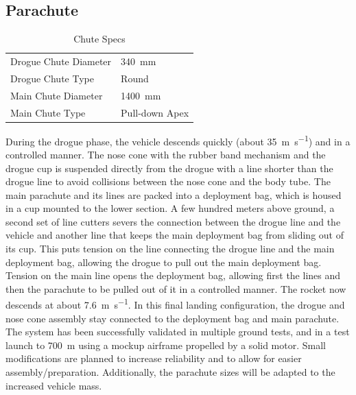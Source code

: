 \subsection{Parachute}

\begin{table}[h]
\centering
\begin{tabular}{ll}
Drogue Chute Diameter & \SI{340}{\milli\meter} \\
Drogue Chute Type & Round \\
Main Chute Diameter & \SI{1400}{\milli\meter} \\
Main Chute Type & Pull-down Apex
\end{tabular}
\caption{Chute Specs}
\label{tab:chute_specs}
\end{table}

During the drogue phase, the vehicle descends quickly (about \SI{35}{\meter\per\second}) and in a controlled manner. The nose cone with the rubber band mechanism and the drogue cup is suspended directly from the drogue with a line shorter than the drogue line to avoid collisions between the nose cone and the body tube. The main parachute and its lines are packed into a deployment bag, which is housed in a cup mounted to the lower section. A few hundred meters above ground, a second set of line cutters severs the connection between the drogue line and the vehicle and another line that keeps the main deployment bag from sliding out of its cup. This puts tension on the line connecting the drogue line and the main deployment bag, allowing the drogue to pull out the main deployment bag. Tension on the main line opens the deployment bag, allowing first the lines and then the parachute to be pulled out of it in a controlled manner. The rocket now descends at about \SI{7.6}{\meter\per\second}.
In this final landing configuration, the drogue and nose cone assembly stay connected to the deployment bag and main parachute. The system has been successfully validated in multiple ground tests, and in a test launch to \SI{700}{\meter} using a mockup airframe propelled by a solid motor. Small modifications are planned to increase reliability and to allow for easier assembly/preparation. Additionally, the parachute sizes will be adapted to the increased vehicle mass.

